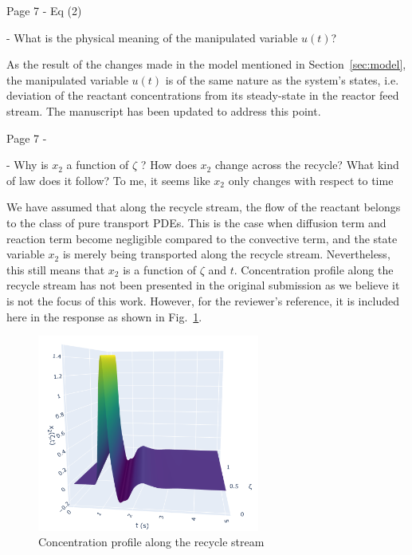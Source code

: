 \documentclass[12pt,answers]{exam}
\begin{document}
\begin{questions}
    \question Page 7 - Eq (2)

    - What is the physical meaning of the manipulated variable $u(t)$?

    \begin{solutionorbox}
        As the result of the changes made in the model mentioned in Section~\ref{sec:model}, the manipulated variable $u(t)$ is of the same nature as the system's states, i.e. deviation of the reactant concentrations from its steady-state in the reactor feed stream. The manuscript has been updated to address this point.
    \end{solutionorbox}


    \question Page 7 - 

    - Why is $x_2$ a function of $\zeta$ ? How does $x_2$ change across the recycle? What kind of law does it follow? To me, it seems like $x_2$ only changes with respect to time

    \begin{solutionorbox}
        We have assumed that along the recycle stream, the flow of the reactant belongs to the class of pure transport PDEs. This is the case when diffusion term and reaction term become negligible compared to the convective term, and the state variable $x_2$ is merely being transported along the recycle stream. Nevertheless, this still means that $x_2$ is a function of $\zeta$ and $t$. Concentration profile along the recycle stream has not been presented in the original submission as we believe it is not the focus of this work. However, for the reviewer's reference, it is included here in the response as shown in Fig.~\ref{fig:x2}.
    \end{solutionorbox}

\begin{figure}[H]
    \centering
    \includegraphics[width=0.65\textwidth]{x2_vs_z.png}
    \caption{Concentration profile along the recycle stream}
    \label{fig:x2}
\end{figure}


\end{questions}
\end{document}
